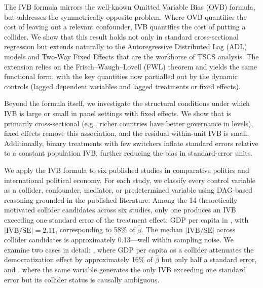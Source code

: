\documentclass[
]{article}
\begin{document}
The IVB formula mirrors the well-known Omitted Variable Bias (OVB)
formula, but addresses the symmetrically opposite problem. Where OVB
quantifies the cost of leaving out a relevant confounder, IVB quantifies
the cost of putting a collider. We show that this result holds not only
in standard cross-sectional regression but extends naturally to the
Autoregressive Distributed Lag (ADL) models and Two-Way Fixed Effects
that are the workhorse of TSCS analysis. The extension relies on the
Frisch--Waugh--Lovell (FWL) theorem
\citep{frisch1933partial, lovell1963seasonal} and yields the same
functional form, with the key quantities now partialled out by the
dynamic controls (lagged dependent variables and lagged treatments or
fixed effects).

Beyond the formula itself, we investigate the structural conditions
under which IVB is large or small in panel settings with fixed effects.
We show that is primarily cross-sectional (e.g., richer countries have
better governance in levels), fixed effects remove this association, and
the residual within-unit IVB is small. Additionally, binary treatments
with few switchers inflate standard errors relative to a constant
population IVB, further reducing the bias in standard-error units.

We apply the IVB formula to six published studies in comparative
politics and international political economy. For each study, we
classify every control variable as a collider, confounder, mediator, or
predetermined variable using DAG-based reasoning grounded in the
published literature. Among the 14 theoretically motivated collider
candidates across six studies, only one produces an IVB exceeding one
standard error of the treatment effect: GDP per capita in
\citet{rogowski_etal2022}, with \(|\text{IVB}/\text{SE}| = 2.11\),
corresponding to 58\% of \(\hat\beta\). The median
\(|\text{IVB}/\text{SE}|\) across collider candidates is approximately
0.13---well within sampling noise. We examine two cases in detail:
\citet{leipziger2024}, where GDP per capita as a collider attenuates the
democratization effect by approximately 16\% of \(\hat\beta\) but only
half a standard error, and \citet{rogowski_etal2022}, where the same
variable generates the only IVB exceeding one standard error but its
collider status is causally ambiguous.
\end{document}
